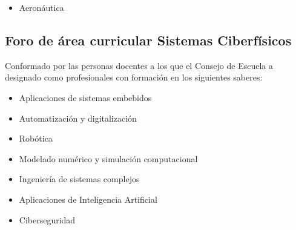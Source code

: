 \begin{itemize}
\item Aeronáutica
\end{itemize}
\subsection*{Foro de área curricular Sistemas Ciberfísicos}

Conformado por las personas docentes a los que el Consejo de Escuela a designado como profesionales con formación en los siguientes saberes:\par

\begin{itemize}
\item Aplicaciones de sistemas embebidos
\item Automatización y digitalización
\item Robótica
\item Modelado numérico y simulación computacional
\item Ingeniería de sistemas complejos
\item Aplicaciones de Inteligencia Artificial
\item Ciberseguridad
\end{itemize}
